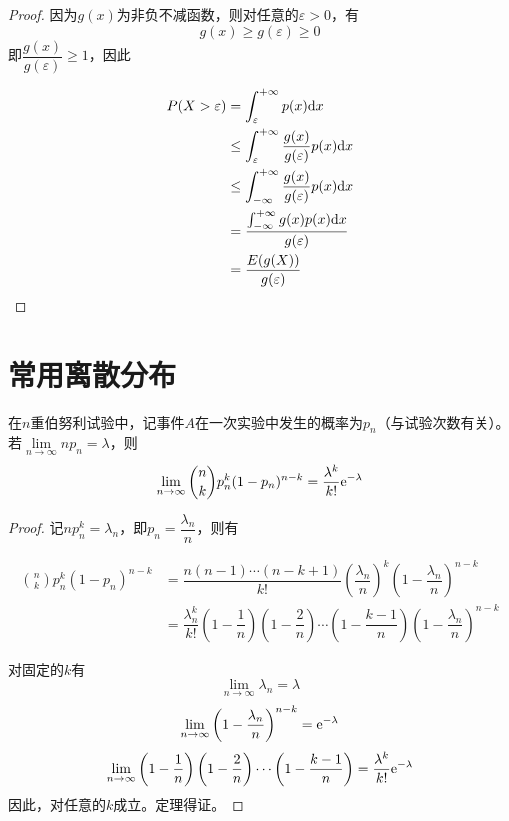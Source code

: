 \begin{proof}

    因为$g(x)$为非负不减函数，则对任意的$\varepsilon > 0$，有
    \[g(x) \geq g(\varepsilon) \geq 0\]
    即$\dfrac{g(x)}{g(\varepsilon)} \geq 1$，因此

    \begin{align*}
        P(X > \varepsilon) & = \int_{\varepsilon}^{+\infty}{p(x)}\mathrm{d} x \\
        & \leq \int_{\varepsilon}^{+\infty}{\dfrac{g(x)}{g(\varepsilon)}p(x)}\mathrm{d} x \\
        & \leq \int_{-\infty}^{+\infty}{\dfrac{g(x)}{g(\varepsilon)}p(x)}\mathrm{d} x \\
        & = \dfrac{\int_{-\infty}^{+\infty}{g(x)p(x)}\mathrm{d} x}{g(\varepsilon)} \\
        & = \dfrac{E(g(X))}{g(\varepsilon)}
    \end{align*}

\end{proof}

\section{常用离散分布}

\begin{theorem}[Poisson定理]

    在$n$重伯努利试验中，记事件$A$在一次实验中发生的概率为$p_n$（与试验次数有关）。若$\lim\limits_{n \to \infty}{n p_n} = \lambda$，则
    \[\lim\limits_{n \to \infty}{\binom{n}{k}p_n^k(1 - p_n)^{n - k}} = \dfrac{\lambda^k}{k!}\mathrm{e}^{-\lambda}\]

\end{theorem}

\begin{proof}

    记$n p_n^k = \lambda_n$，即$p_n = \dfrac{\lambda_n}{n}$，则有

    \begin{align*}
        \binom{n}{k}p_n^k(1 - p_n)^{n - k} & = \dfrac{n(n - 1) \cdots (n - k + 1)}{k!} \left( \dfrac{\lambda_n}{n} \right)^k \left( 1 - \dfrac{\lambda_n}{n} \right)^{n - k} \\
        & = \dfrac{\lambda_n^k}{k!} \left( 1 - \dfrac{1}{n} \right) \left( 1 - \dfrac{2}{n} \right) \cdots \left( 1 - \dfrac{k - 1}{n} \right) \left( 1 - \dfrac{\lambda_n}{n} \right)^{n - k}
    \end{align*}

    对固定的$k$有
    \[\lim\limits_{n \to \infty}{\lambda_n} = \lambda\]
    \[\lim\limits_{n \to \infty}{ \left( 1 - \dfrac{\lambda_n}{n} \right)^{n - k}} = \mathrm{e}^{-\lambda}\]
    \[\lim\limits_{n \to \infty}{ \left( 1 - \dfrac{1}{n} \right) \left( 1 - \dfrac{2}{n} \right) \cdots \left( 1 - \dfrac{k - 1}{n} \right)} = \dfrac{\lambda^k}{k!}\mathrm{e}^{-\lambda}\]
    因此，对任意的$k$成立。定理得证。

\end{proof}
